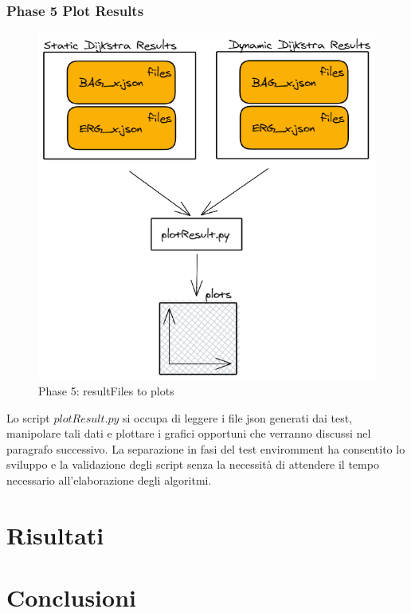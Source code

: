 \documentclass[a4paper]{article}
\begin{document}
\subsubsection{Phase 5 Plot Results}
\begin{figure}[!h]
\includegraphics[scale=0.4]{img/05_resultFiles_to_plots}
\centering
\caption{Phase 5: resultFiles to plots}
\end{figure}
Lo script $plotResult.py$ si occupa di leggere i file json generati dai test, manipolare tali dati e plottare i grafici opportuni che verranno discussi nel paragrafo successivo. La separazione in fasi del test enviromment ha consentito lo sviluppo e la validazione degli script senza la necessità di attendere il tempo necessario all'elaborazione degli algoritmi.
\newpage
\section{Risultati}

\section{Conclusioni}
\end{document}
